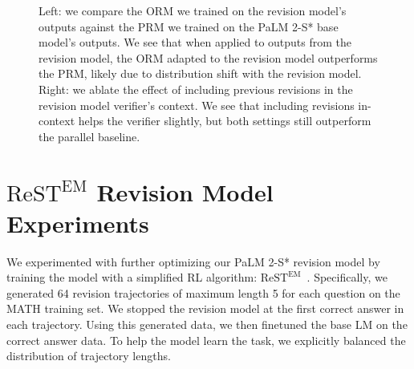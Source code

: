 \documentclass[11pt, letterpaper, logo]{googledeepmind}
\begin{document}
\begin{figure}
    \centering
    \hfill
    \caption{Left: we compare the ORM we trained on the revision model's outputs against the PRM we trained on the PaLM 2-S* base model's outputs. We see that when applied to outputs from the revision model, the ORM adapted to the revision model outperforms the PRM, likely due to distribution shift with the revision model. Right: we ablate the effect of including previous revisions in the revision model verifier's context. We see that including revisions in-context helps the verifier slightly, but both settings still outperform the parallel baseline.}
    \label{fig:revision_verifier_ablations}
\end{figure}

\section{$\text{ReST}^{\text{EM}}$ Revision Model Experiments}
\label{app:rest_revision_model}

We experimented with further optimizing our PaLM 2-S* revision model by training the model with a simplified RL algorithm: $\text{ReST}^{\text{EM}}$~\citep{singh2024human}. Specifically, we generated 64 revision trajectories of maximum length 5 for each question on the MATH training set. We stopped the revision model at the first correct answer in each trajectory. Using this generated data, we then finetuned the base LM on the correct answer data. To help the model learn the task, we explicitly balanced the distribution of trajectory lengths.
\end{document}
